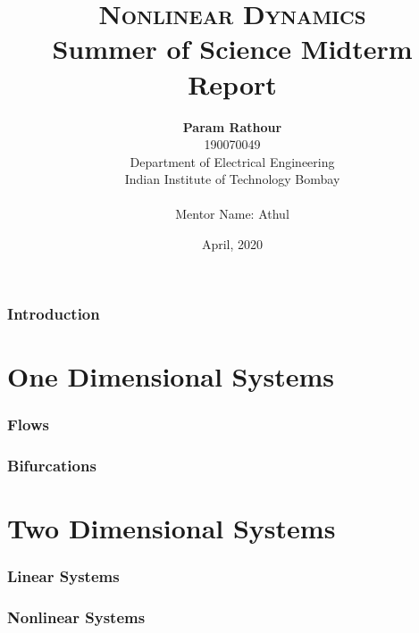 \documentclass[a4paper]{article}
\title{\textbf{\textsc{Nonlinear Dynamics}} \\ \Large{Summer of Science Midterm Report}}
\date{April, 2020}
\author{\textbf{{Param Rathour}}\\190070049\\Department of Electrical Engineering\\Indian Institute of Technology Bombay\\ \\ Mentor Name: Athul}
\numberwithin{equation}{section}
\numberwithin{figure}{section}
\numberwithin{table}{section}
\theoremstyle{remark}
\begin{document}



\newpage
\begin{titlepage}
	\null\vspace{\fill}
	
	\vspace{\fill}
	\renewcommand{\abstractname}{Acknowledgements}
	
	\vspace{\fill}
\end{titlepage}

\newpage
{}
\setcounter{tocdepth}{2}
\tableofcontents

\newpage
{}

\section{Introduction}
 

\newpage
\part{One Dimensional Systems}

\section{Flows}


\section{Bifurcations}


\newpage
\part{Two Dimensional Systems}


\section{Linear Systems}


\section{Nonlinear Systems}

\end{document}
